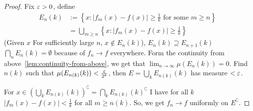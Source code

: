\begin{proof}
  Fix $\varepsilon > 0$, define 
  \begin{align*}
    E_n(k) &:= \left\{x : |f_m(x) - f(x)| \ge \frac1k \text{ for some }m \ge n\right\} \\
    &= \bigcup_{m \ge n} \left\{x : |f_m(x) - f(x)| \ge \frac1k\right\}
  \end{align*}
  (Given $x$ For sufficiently large $n$, $x \notin E_n(k)$), $E_n(k) \supseteq E_{n+1}(k)$
  $\bigcap_n E_n(k) = \emptyset$ because of $f_n \to f$ everywhere.
  Form the continuity from above~\ref{lem:continuity-from-above}, we get that $\lim_{n\to\infty}\mu(E_n(k)) = 0$.
  Find $n(k)$ such that $\mu(E_{n(k)}(k)) < \frac{\varepsilon}{2^k}$, then $E = \bigcup_k E_{n(k)}(k)$ has measure $< \varepsilon$.
  
  For $x\in \left(\bigcup_k E_{n(k)}(k)\right)^\complement = \bigcap_k E_{n(k)}(k)^\complement$
  I have for all $k$ $|f_m(x) - f(x)| < \frac1k$ for all $m \ge n(k)$.
  So, we get $f_n \to f$ uniformly on $E^\complement$.
\end{proof}